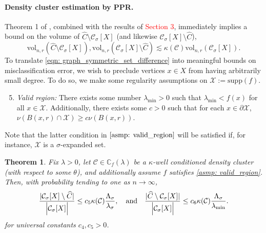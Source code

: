 \documentclass{article}
\DeclarePairedDelimiter\abs{\lvert}{\rvert}
\newcommand{\vol}{\mathrm{vol}}
\newcommand{\1}{\mathbf{1}}
\newcommand{\Xbf}{X}             %
\newcommand{\Cbb}{\mathbb{C}}
\newcommand{\Cset}{\mathcal{C}}
\newcommand{\Csig}{\Cset_{\sigma}}
\newcommand{\Cest}{\widehat{C}}
\newcommand{\ppr}{{\sc PPR}}
\theoremstyle{aldenthm}
\newtheorem{theorem}{Theorem}
\theoremstyle{aldenrmrk}
\begin{document}
\paragraph{Density cluster estimation by \ppr.}

Theorem 1 of \cite{zhu2013}, combined with the results of \textcolor{red}{Section 3}, immediately implies a bound on the volume of $\Cest \setminus \Csig[\Xbf]$ (and likewise $\Csig[\Xbf] \setminus \Cest$),
\begin{equation}
\label{eqn: graph_symmetric_set_difference}
\vol_{n,r}(\Cest \setminus \Csig[\Xbf]), \vol_{n,r}(\Csig[\Xbf] \setminus \Cest) \lesssim \kappa(\Cset) \vol_{n,r}(\Csig[\Xbf]).
\end{equation}
To translate \eqref{eqn: graph_symmetric_set_difference} into meaningful bounds on misclassification error, we wish to preclude vertices $x \in \Xbf$ from having arbitrarily small degree. To do so, we make some regularity assumptions on $\mathcal{X} := \mathrm{supp}(f)$.
\begin{enumerate}[label=(A\arabic*)]
	\setcounter{enumi}{4}
	\item 
	\label{asmp: valid_region}
	\emph{Valid region:} There exists some number $\lambda_{\min} > 0$ such that $\lambda_{\min} < f(x)$ for all $x \in \mathcal{X}$. Additionally, there exists some $c > 0$ such that for each $x \in \partial \mathcal{X}$, $\nu(B(x,r) \cap \mathcal{X}) \geq c\nu(B(x,r))$.
\end{enumerate}
Note that the latter condition in $\ref{asmp: valid_region}$ will be satisfied if, for instance, $\mathcal{X}$ is a $\sigma$-expanded set.

\begin{theorem}
	\label{thm: misclassification_rate}
	Fix $\lambda > 0$, let $\Cset \in \Cbb_f(\lambda)$ be a $\kappa$-well conditioned density cluster (with respect to some $\theta$), and additionally assume $f$ satisfies \ref{asmp: valid_region}. Then, with probability tending to one as $n \to \infty$,
	\begin{equation}
	\label{eqn: misclassification_rate_ub}
	\frac{\abs{\Csig[\Xbf] \setminus \Cest}}{\Bigl|\Csig[\Xbf]\Bigr|} \leq c_5 \kappa(\Cset) \frac{\Lambda_{\sigma}}{\lambda_{\sigma}}, \quad \textrm{and} \quad \frac{\abs{\Cest \setminus \Csig[\Xbf]}}{\Bigl|\Csig[\Xbf]\Bigr|} \leq c_6 \kappa(\Cset) \frac{\Lambda_{\sigma}}{\lambda_{\min}}.
	\end{equation}
	for universal constants $c_4, c_5 > 0$. 
\end{theorem}
\end{document}
